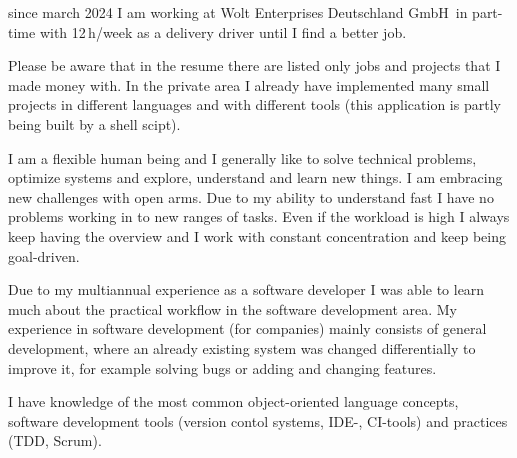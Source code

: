 \documentclass[fromphone,parskip=half]{scrlttr2}%
\newcommand\versionLanguageStart{}
\newcommand\versionLanguageEnd{}
\begin{document}
	\begin{letter}%
	{
		\addressReceiver
	}
		\opening{\joinList{\dear}{\genderReceiver}{\surnameReceiver}{,}}
\versionLanguageStart%
		since march 2024 I am working at \glqq Wolt Enterprises Deutschland GmbH\grqq\ in part-time with 12\,h/week as a delivery driver until I find a better job.
\versionLanguageEnd
		
		
\versionLanguageStart%
		Please be aware that in the resume there are listed only jobs and projects that I made money with.
		In the private area I already have implemented many small projects in different languages and with different tools (this application is partly being built by a shell scipt).
\versionLanguageEnd

\versionLanguageStart%
		I am a flexible human being and I generally like to solve technical problems, optimize systems and explore, understand and learn new things.
		I am embracing new challenges with open arms.
		Due to my ability to understand fast I have no problems working in to new ranges of tasks.
		Even if the workload is high I always keep having the overview and I work with constant concentration and keep being goal-driven.
\versionLanguageEnd
		
\versionLanguageStart%
		Due to my multiannual experience as a software developer I was able to learn much about the practical workflow in the software development area.
		My experience in software development (for companies) mainly consists of general development, where an already existing system was changed differentially to improve it, for example solving bugs or adding and changing features.
\versionLanguageEnd

\versionLanguageStart%
		I have knowledge of the most common object-oriented language concepts, software development tools (version contol systems, IDE-, CI-tools) and practices (TDD, Scrum).
\versionLanguageEnd

%
%		
		

\end{letter}
\end{document}
